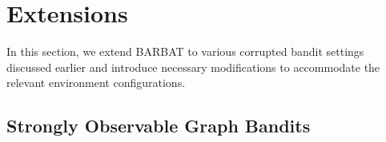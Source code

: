 \section{Extensions}
\label{sec:ext}
In this section, we extend BARBAT to various corrupted bandit settings discussed earlier and introduce necessary modifications to accommodate the relevant environment configurations. %

\subsection{Strongly Observable Graph Bandits}
\label{sec:sog}




